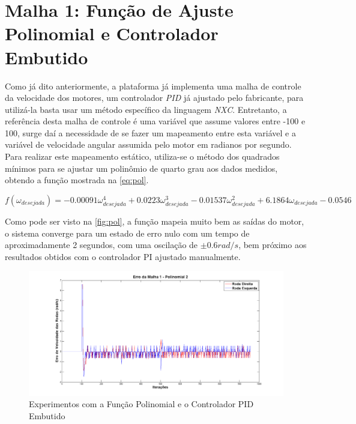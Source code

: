 \section{Malha 1: Função de Ajuste Polinomial e Controlador Embutido}
\label{m1ContPol}
Como já dito anteriormente, a plataforma já implementa uma malha de controle da velocidade dos motores, um controlador \emph{PID} já ajustado pelo fabricante, para utilizá-la basta usar um método específico da linguagem \emph{NXC}. Entretanto, a referência desta malha de controle é uma variável que assume valores entre -100 e 100, surge daí a necessidade de se fazer um mapeamento entre esta variável e a variável de velocidade angular assumida pelo motor em radianos por segundo. Para realizar este mapeamento estático, utiliza-se o método dos quadrados mínimos para se ajustar um polinômio de quarto grau aos dados medidos, obtendo a função mostrada na \autoref{eq:pol}.

\begin{equation}
f(\omega_{desejada}) = -0.00091\omega_{desejada}^{4} + 0.0223\omega_{desejada}^{3} - 0.01537\omega_{desejada}^{2} + 6.1864\omega_{desejada} - 0.0546
\label{eq:pol}
\end{equation} 
 
 Como pode ser visto na \autoref{fig:pol}, a função mapeia muito bem as saídas do motor, o sistema converge para um estado de erro nulo com um tempo de aproximadamente 2 segundos, com uma oscilação de $\pm0.6 rad/s$, bem próximo aos resultados obtidos com o controlador PI ajustado manualmente.
 
 \begin{figure}[!htb]
 	\centering
	\includegraphics[width=.9\linewidth]{./Testes/Malha1/Polinomial/Polinomial}
 	\caption{Experimentos com a Função Polinomial e o Controlador PID Embutido}
 	\label{fig:pol}
 \end{figure}
 
